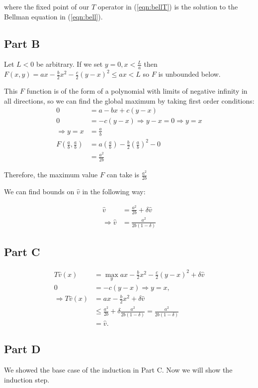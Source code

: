 \documentclass[11pt]{article} %
\begin{document}
where the fixed point of our $T$ operator in (\ref{eqn:bellT}) is the solution to the Bellman equation in (\ref{eqn:bell}).

\subsection{Part B}

Let $L<0$ be arbitrary. If we set $y=0,x<\frac{L}{a}$ then $F(x,y) = ax -\frac{b}{2}x^2 - \frac{c}{2}(y-x)^2 \leq ax<L$ so $F$ is unbounded below.

This $F$ function is of the form of a polynomial with limits of negative infinity in all directions, so we can find the global maximum by taking first order conditions:
 \begin{align*}
0 &= a - bx + c(y-x)\\
0 &= -c(y-x) \Rightarrow y-x = 0 \Rightarrow y=x\\
\Rightarrow y = x &= \frac{a}{b}\\
F\left( \frac{a}{b},\frac{a}{b} \right) &= a\left(\frac{a}{b}\right) - \frac{b}{2}\left( \frac{a}{b}\right)^2 - 0\\
&= \frac{a^2}{2b}
\end{align*}

Therefore, the maximum value $F$ can take is $\frac{a^2}{2b}$

We can find bounds on $\hat{v}$ in the following way:

\begin{align*}
\hat{v} &= \frac{a^2}{2b} + \delta \hat{v}\\
\Rightarrow \hat{v} &= \frac{a^2}{2b(1-\delta)} 
\end{align*}

\subsection{Part C}
\begin{align*}
T\hat{v}(x) &= \max_{y} ax - \frac{b}{2}x^2 - \frac{c}{2}(y-x)^2 + \delta \hat{v}\\
0 &= -c(y-x) \Rightarrow y=x,\\
\Rightarrow T\hat{v}(x) &= ax -\frac{b}{2}x^2 +\delta \hat{v} \\
&\leq \frac{a^2}{2b} +\delta \frac{a^2}{2b(1-\delta)} = \frac{a^2}{2b(1-\delta)}\\
&= \hat{v}.
\end{align*}

\subsection{Part D}
We showed the base case of the induction in Part C. Now we will show the induction step.
\end{document}
